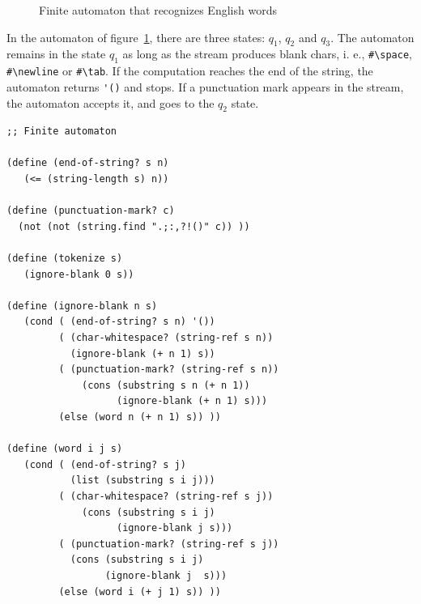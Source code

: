 \documentclass[a4paper,12pt]{book}
\newenvironment{fmpage}[1]
               {\begin{lrbox}{\fmbox}\begin{minipage}{#1}}
               {\end{minipage}\end{lrbox}\fbox{\usebox{\fmbox}}}
\begin{document}
\begin{figure}[!h]
\renewcommand\figurename{Fig.}
\caption{Finite automaton that recognizes English words}
\label{fig:automaton}
\end{figure}

In the automaton of figure~\ref{fig:automaton}, there
are three states: $q_1$, $q_2$ and $q_3$.
The automaton remains in the state $q_1$ as long as
the stream produces blank chars, i. e., \verb|#\space|,
\verb|#\newline| or \verb|#\tab|. If the computation
reaches the end of the string, the automaton returns
\verb|'()| and stops. If a punctuation mark appears
in the stream, the automaton accepts it, and goes
to the $q_2$ state. 


\begin{fmpage}{0.9\linewidth}
\begin{verbatim}
;; Finite automaton

(define (end-of-string? s n)
   (<= (string-length s) n))

(define (punctuation-mark? c)
  (not (not (string.find ".;:,?!()" c)) ))

(define (tokenize s)
   (ignore-blank 0 s))

(define (ignore-blank n s)
   (cond ( (end-of-string? s n) '())
         ( (char-whitespace? (string-ref s n)) 
           (ignore-blank (+ n 1) s))
         ( (punctuation-mark? (string-ref s n))
             (cons (substring s n (+ n 1))
                   (ignore-blank (+ n 1) s)))
         (else (word n (+ n 1) s)) )) 

(define (word i j s)
   (cond ( (end-of-string? s j)
           (list (substring s i j)))
         ( (char-whitespace? (string-ref s j))
             (cons (substring s i j)
                   (ignore-blank j s)))
         ( (punctuation-mark? (string-ref s j))
           (cons (substring s i j)
                 (ignore-blank j  s)))
         (else (word i (+ j 1) s)) ))
\end{verbatim}
\end{fmpage}
\end{document}

